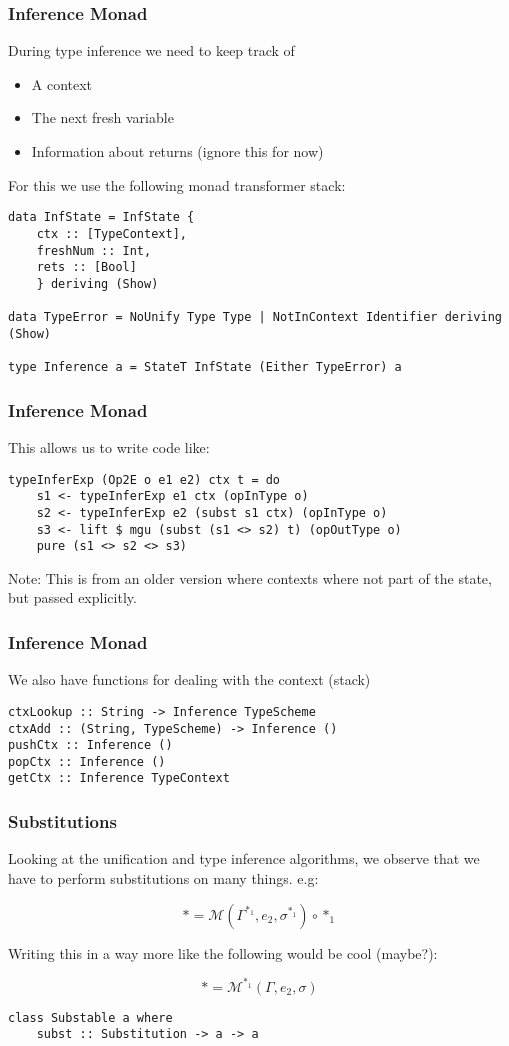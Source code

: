 \documentclass{beamer}
\begin{document}
\begin{frame}[fragile]
\frametitle{Inference Monad}
During type inference we need to keep track of
\begin{itemize}
\item A context
\item The next fresh variable
\item Information about returns (ignore this for now)
\end{itemize}

For this we use the following monad transformer stack:

\begin{lstlisting}
data InfState = InfState {
    ctx :: [TypeContext],
    freshNum :: Int,
    rets :: [Bool]
    } deriving (Show)

data TypeError = NoUnify Type Type | NotInContext Identifier deriving (Show)

type Inference a = StateT InfState (Either TypeError) a
\end{lstlisting}
\end{frame}

\begin{frame}[fragile]
\frametitle{Inference Monad}

This allows us to write code like:
\begin{lstlisting}
typeInferExp (Op2E o e1 e2) ctx t = do
    s1 <- typeInferExp e1 ctx (opInType o)
    s2 <- typeInferExp e2 (subst s1 ctx) (opInType o)
    s3 <- lift $ mgu (subst (s1 <> s2) t) (opOutType o)
    pure (s1 <> s2 <> s3)
\end{lstlisting}
Note: This is from an older version where contexts where not part of the state, but passed explicitly.
\end{frame}


\begin{frame}[fragile]
\frametitle{Inference Monad}
We also have functions for dealing with the context (stack)

\begin{lstlisting}
ctxLookup :: String -> Inference TypeScheme
ctxAdd :: (String, TypeScheme) -> Inference ()
pushCtx :: Inference ()
popCtx :: Inference ()
getCtx :: Inference TypeContext
\end{lstlisting}
\end{frame}

\begin{frame}[fragile]
\frametitle{Substitutions}
Looking at the unification and type inference algorithms, we observe that we have to perform substitutions on many things. e.g:

\[
* = \mathcal{M} (\Gamma ^{*_1}, e_2, \sigma^{*_1}) \circ *_1
\]

Writing this in a way more like the following would be cool (maybe?):

\[
* = \mathcal{M}^{*_1}(\Gamma, e_2, \sigma)
\]

\begin{lstlisting}
class Substable a where
    subst :: Substitution -> a -> a
\end{lstlisting}
\end{frame}
\end{document}
